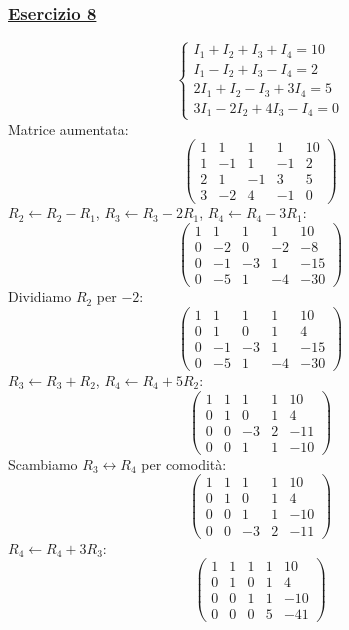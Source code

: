 \subsubsection*{\hyperref[ex:8]{Esercizio 8}}
\[
\begin{cases}
I_1 + I_2 + I_3 + I_4 = 10 \\
I_1 - I_2 + I_3 - I_4 = 2 \\
2I_1 + I_2 - I_3 + 3I_4 = 5 \\
3I_1 - 2I_2 + 4I_3 - I_4 = 0
\end{cases}
\]
Matrice aumentata:
\[
\left(\begin{array}{cccc|c}
1 & 1 & 1 & 1 & 10 \\
1 & -1 & 1 & -1 & 2 \\
2 & 1 & -1 & 3 & 5 \\
3 & -2 & 4 & -1 & 0
\end{array}\right)
\]
\(R_2 \leftarrow R_2 - R_1\), \(R_3 \leftarrow R_3 - 2R_1\), \(R_4 \leftarrow R_4 - 3R_1\):
\[
\left(\begin{array}{cccc|c}
1 & 1 & 1 & 1 & 10 \\
0 & -2 & 0 & -2 & -8 \\
0 & -1 & -3 & 1 & -15 \\
0 & -5 & 1 & -4 & -30
\end{array}\right)
\]
Dividiamo \(R_2\) per \(-2\):
\[
\left(\begin{array}{cccc|c}
1 & 1 & 1 & 1 & 10 \\
0 & 1 & 0 & 1 & 4 \\
0 & -1 & -3 & 1 & -15 \\
0 & -5 & 1 & -4 & -30
\end{array}\right)
\]
\(R_3 \leftarrow R_3 + R_2\), \(R_4 \leftarrow R_4 + 5R_2\):
\[
\left(\begin{array}{cccc|c}
1 & 1 & 1 & 1 & 10 \\
0 & 1 & 0 & 1 & 4 \\
0 & 0 & -3 & 2 & -11 \\
0 & 0 & 1 & 1 & -10
\end{array}\right)
\]
Scambiamo \(R_3 \leftrightarrow R_4\) per comodità:
\[
\left(\begin{array}{cccc|c}
1 & 1 & 1 & 1 & 10 \\
0 & 1 & 0 & 1 & 4 \\
0 & 0 & 1 & 1 & -10 \\
0 & 0 & -3 & 2 & -11
\end{array}\right)
\]
\(R_4 \leftarrow R_4 + 3R_3\):
\[
\left(\begin{array}{cccc|c}
1 & 1 & 1 & 1 & 10 \\
0 & 1 & 0 & 1 & 4 \\
0 & 0 & 1 & 1 & -10 \\
0 & 0 & 0 & 5 & -41
\end{array}\right)
\]
